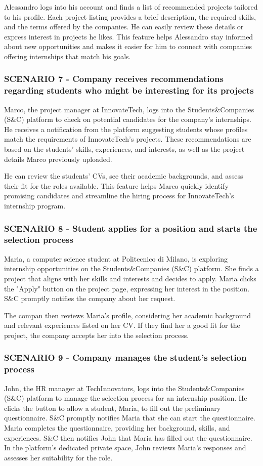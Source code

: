 Alessandro logs into his account and finds a list of recommended projects tailored to his profile.
Each project listing provides a brief description, the required skills, and the terms offered by
the companies. He can easily review these details or express interest in projects he likes.
This feature helps Alessandro stay informed about new opportunities and makes it easier for
him to connect with companies offering internships that match his goals.
\subsubsection{SCENARIO 7 - Company receives recommendations regarding students who might be interesting for its projects}
Marco, the project manager at InnovateTech, logs into the Students\&Companies (S\&C) platform
to check on potential candidates for the company’s internships. He receives a notification
from the platform suggesting students whose profiles match the requirements of InnovateTech’s projects.
These recommendations are based on the students’ skills, experiences, and interests, as well as
the project details Marco previously uploaded.

He can review the students’ CVs, see their academic
backgrounds, and assess their fit for the roles available. This feature helps Marco quickly identify
 promising candidates and streamline the hiring process for InnovateTech’s internship program.
\subsubsection{SCENARIO 8 - Student applies for a position and starts the selection process}
Maria, a computer science student at Politecnico di Milano, is exploring internship opportunities
on the Students\&Companies (S\&C) platform. She finds a project that aligns with her skills and
interests and decides to apply. Maria clicks the "Apply" button on the project page, expressing
her interest in the position. S\&C promptly notifies the company about her request.

The compan then reviews Maria’s profile, considering her academic background and relevant
experiences listed on her CV. If they find her a good fit for the project, the company accepts
her into the selection process.
\subsubsection{SCENARIO 9 - Company manages the student's selection process}
John, the HR manager at TechInnovators, logs into the Students\&Companies (S\&C) platform
to manage the selection process for an internship position. He clicks the button to allow a student,
Maria, to fill out the preliminary questionnaire. S\&C promptly notifies Maria that she can start
the questionnaire. Maria completes the questionnaire, providing her background, skills, and experiences.
S\&C then notifies John that Maria has filled out the questionnaire. In the platform’s dedicated
private space, John reviews Maria’s responses and assesses her suitability for the role.

